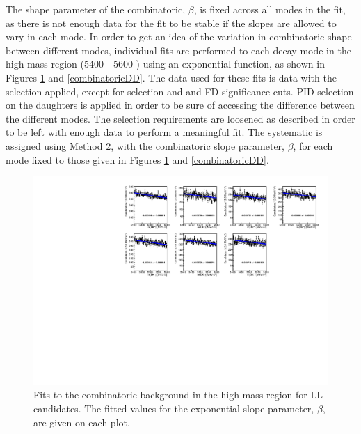 The shape parameter of the combinatoric, $\beta$, is fixed across all \Dz modes in the \CP fit, as there is not enough data for the fit to be stable if the slopes are allowed to vary in each mode. In order to get an idea of the variation in combinatoric shape between different \Dz modes, individual fits are performed to each \Dz decay mode in the high \Bm mass region (5400 - 5600 \mevcc) using an exponential function, as shown in Figures \ref{combinatoricLL} and \ref{combinatoricDD}. The data used for these fits is \runone data with the selection applied, except for \Kstar selection and \Dz and \KS FD significance cuts. PID selection on the \Dz daughters is applied in order to be sure of accessing the difference between the different \Dz modes. The selection requirements are loosened as described in order to be left with enough data to perform a meaningful fit. The systematic is assigned using Method 2, with the combinatoric slope parameter, $\beta$, for each \Dz mode fixed to those given in Figures \ref{combinatoricLL} and \ref{combinatoricDD}.

\begin{figure}[h]
\centering
\includegraphics[width=\linewidth]{figures/fitComponents/combinatoricFits_LL.pdf}
\caption{Fits to the combinatoric background in the high \Bm mass region for LL candidates. The fitted values for the exponential slope parameter, $\beta$, are given on each plot.}
\label{combinatoricLL}
\end{figure}


